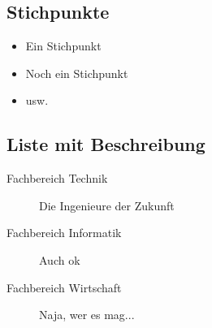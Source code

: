 \subsection{Stichpunkte}
\begin{itemize}
	\item Ein Stichpunkt
	\item Noch ein Stichpunkt
	\item usw.
\end{itemize}

\subsection{Liste mit Beschreibung}
\begin{description}
	\item[Fachbereich Technik] Die Ingenieure der Zukunft
	\item[Fachbereich Informatik] Auch ok
	\item[Fachbereich Wirtschaft] Naja, wer es mag...
\end{description}
